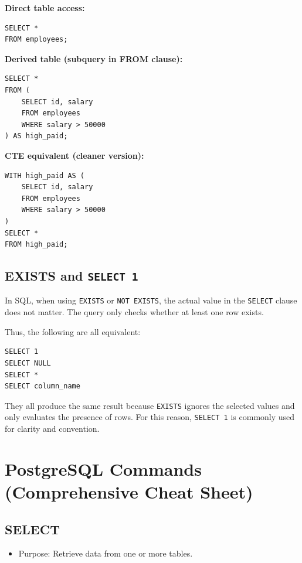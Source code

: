 \documentclass[10pt]{article}
\newcommand{\newbp}{%
  \newpage
  \mbox{}
  \newpage
}
\begin{document}
\textbf{Direct table access:}

\begin{verbatim}
SELECT *
FROM employees;
\end{verbatim}

\textbf{Derived table (subquery in FROM clause):}

\begin{verbatim}
SELECT *
FROM (
    SELECT id, salary
    FROM employees
    WHERE salary > 50000
) AS high_paid;
\end{verbatim}

\textbf{CTE equivalent (cleaner version):}

\begin{verbatim}
WITH high_paid AS (
    SELECT id, salary
    FROM employees
    WHERE salary > 50000
)
SELECT *
FROM high_paid;
\end{verbatim}

\subsection{EXISTS and \texttt{SELECT 1}}

In SQL, when using \texttt{EXISTS} or \texttt{NOT EXISTS}, the actual value in the \texttt{SELECT} clause does not matter. The query only checks whether at least one row exists.

Thus, the following are all equivalent:

\begin{verbatim}
SELECT 1
SELECT NULL
SELECT *
SELECT column_name
\end{verbatim}

They all produce the same result because \texttt{EXISTS} ignores the selected values and only evaluates the presence of rows. For this reason, \texttt{SELECT 1} is commonly used for clarity and convention.

\newbp
\section{PostgreSQL Commands (Comprehensive Cheat Sheet)}

\subsection{SELECT}
\begin{itemize}
    \item Purpose: Retrieve data from one or more tables.
\end{itemize}
\end{document}
